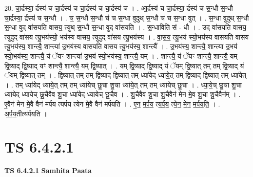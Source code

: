 \documentclass[17pt]{extarticle}
\begin{document}
20. चा॒र्द्रस्या॒ र्द्रस्य॑ च चा॒र्द्रस्य॑ च चा॒र्द्रस्य॑ च चा॒र्द्रस्य॑ च । . आ॒र्द्रस्य॑ च चा॒र्द्रस्या॒ र्द्रस्य॑ च स॒न्धौ स॒न्धौ चा॒र्द्रस्या॒ र्द्रस्य॑ च स॒न्धौ । . च॒ स॒न्धौ स॒न्धौ च॑ च स॒न्धा वुदुथ् स॒न्धौ च॑ च स॒न्धा वुत् । . स॒न्धा वुदुथ् स॒न्धौ स॒न्धा वुद् वा॑सयति वासय॒ त्युथ् स॒न्धौ स॒न्धा वुद् वा॑सयति । . स॒न्धाविति॑ सं - धौ । . उद् वा॑सयति वासय॒ त्युदुद् वा॑सय त्यु॒भय॑स्यो॒ भय॑स्य वासय॒ त्युदुद् वा॑सय त्यु॒भय॑स्य । . वा॒स॒य॒ त्यु॒भय॑ स्यो॒भय॑स्य वासयति वासय त्यु॒भय॑स्य॒ शान्त्यै॒ शान्त्या॑ उ॒भय॑स्य वासयति वासय
त्यु॒भय॑स्य॒ शान्त्यै᳚ । . उ॒भय॑स्य॒ शान्त्यै॒ शान्त्या॑ उ॒भय॑ स्यो॒भय॑स्य॒ शान्त्यै॒ यं ॅयꣳ शान्त्या॑ उ॒भय॑ स्यो॒भय॑स्य॒ शान्त्यै॒ यम् । . शान्त्यै॒ यं ॅयꣳ शान्त्यै॒ शान्त्यै॒ यम् द्वि॒ष्याद् द्वि॒ष्याद् यꣳ शान्त्यै॒ शान्त्यै॒ यम् द्वि॒ष्यात् । . यम् द्वि॒ष्याद् द्वि॒ष्याद् यं ॅयम् द्वि॒ष्यात् तम् तम् द्वि॒ष्याद् यं ॅयम् द्वि॒ष्यात् तम् । . द्वि॒ष्यात् तम् तम् द्वि॒ष्याद् द्वि॒ष्यात् तम् ध्या॑येद् ध्याये॒त् तम् द्वि॒ष्याद् द्वि॒ष्यात् तम् ध्या॑येत् । . तम् ध्या॑येद् ध्याये॒त् तम् तम् ध्या॑येच् छु॒चा शु॒चा ध्या॑ये॒त् तम् तम् ध्या॑येच् छु॒चा । . ध्या॒ये॒च् छु॒चा शु॒चा ध्या॑येद् ध्यायेच् छु॒चैवैव शु॒चा ध्या॑येद् ध्यायेच् छु॒चैव । . शु॒चैवैव शु॒चा शु॒चैवैन॑ मेन मे॒व शु॒चा शु॒चैवैन᳚म् । . ए॒वैन॑ मेन मे॒वै वैन॑ मर्पय त्यर्पय त्येन मे॒वै वैन॑ मर्पयति । . ए॒न॒ म॒र्प॒य॒ त्य॒र्प॒य॒ त्ये॒न॒ मे॒न॒ म॒र्प॒य॒ति॒ । . अ॒र्प॒य॒तीत्य॑र्पयति । \newline
\pagebreak
{}

\section{ TS 6.4.2.1 }

\textbf{TS 6.4.2.1 } \newline
\textbf{Samhita Paata} \newline
\end{document}
